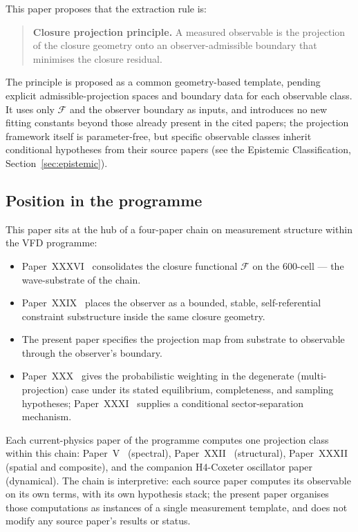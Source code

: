 \documentclass[12pt]{article}
\newcommand{\Fcal}{\mathcal{F}}
\begin{document}
This paper proposes that the extraction rule is:

\begin{quote}
\textbf{Closure projection principle.} A measured observable is the projection of the closure geometry onto an observer-admissible boundary that minimises the closure residual.
\end{quote}

The principle is proposed as a common geometry-based template, pending explicit admissible-projection spaces and boundary data for each observable class. It uses only $\Fcal$ and the observer boundary as inputs, and introduces no new fitting constants beyond those already present in the cited papers; the projection framework itself is parameter-free, but specific observable classes inherit conditional hypotheses from their source papers (see the Epistemic Classification, Section~\ref{sec:epistemic}).

\subsection*{Position in the programme}

This paper sits at the hub of a four-paper chain on measurement structure within the VFD programme:
\begin{itemize}
    \item Paper~XXXVI~\citep{SmartXXXVI} consolidates the closure functional $\Fcal$ on the 600-cell --- the wave-substrate of the chain.
    \item Paper~XXIX~\citep{SmartXXIX} places the observer as a bounded, stable, self-referential constraint substructure inside the same closure geometry.
    \item The present paper specifies the projection map from substrate to observable through the observer's boundary.
    \item Paper~XXX~\citep{SmartXXX} gives the probabilistic weighting in the degenerate (multi-projection) case under its stated equilibrium, completeness, and sampling hypotheses; Paper~XXXI~\citep{SmartXXXI} supplies a conditional sector-separation mechanism.
\end{itemize}
Each current-physics paper of the programme computes one projection class within this chain: Paper~V~\citep{SmartV} (spectral), Paper~XXII~\citep{SmartXXII} (structural), Paper~XXXII~\citep{SmartXXXII} (spatial and composite), and the companion H4-Coxeter oscillator paper~\citep{H4Coxeter2026} (dynamical). The chain is interpretive: each source paper computes its observable on its own terms, with its own hypothesis stack; the present paper organises those computations as instances of a single measurement template, and does not modify any source paper's results or status.
\end{document}
